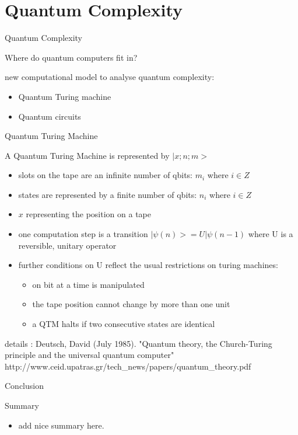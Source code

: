 \documentclass[c]{beamer}
\begin{document}
\section{Quantum Complexity}

\begin{frame}{Quantum Complexity}

Where do quantum computers fit in?

new computational model to analyse quantum complexity:
\begin{itemize}
\item Quantum Turing machine
\item Quantum circuits
\end{itemize}

\end{frame}

\begin{frame}{Quantum Turing Machine}

A Quantum Turing Machine is represented by $|x;n;m>$
\begin{itemize}
\item slots on the tape are an infinite number of qbits: $m_i$ where $i \in Z$ 
\item states are represented by a finite number of qbits: $n_i$ where $i \in Z$
\item $x$ representing the position on a tape
\item one computation step is a transition $|\psi(n)> = U|\psi(n-1)$ where
U is a reversible, unitary operator
\item further conditions on U reflect the usual restrictions on turing machines: 
\begin{itemize}
\item on bit at a time is manipulated
\item the tape position cannot change by more than one unit
\item a QTM halts if two consecutive states are identical
\end{itemize}
\end{itemize}

details : Deutsch, David (July 1985). "Quantum theory, the Church-Turing principle and the universal quantum computer"
http://www.ceid.upatras.gr/tech_news/papers/quantum_theory.pdf

\end{frame}

\begin{frame}{Conclusion}
	\begin{block}{Summary}
		\begin{itemize}
			\item add nice summary here.
		\end{itemize}
	\end{block}
\end{frame}
\end{document}
